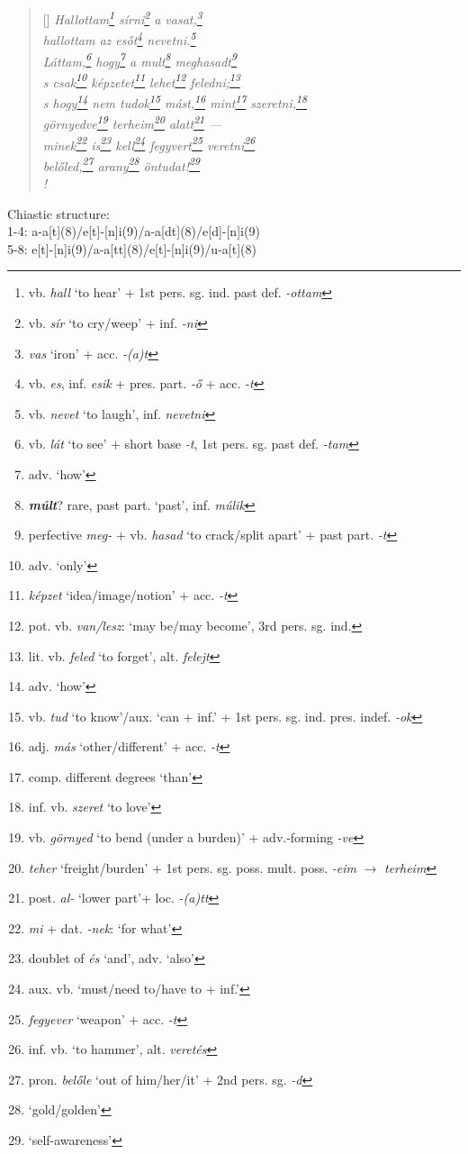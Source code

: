 \documentclass[a4paper,12pt,twoside,final]{book}
\begin{document}
\begin{verse}[\versewidth]
  \it
  Hallottam\footnote{vb. \emph{hall} `to hear' + 1st
  pers. sg. ind. past def. \emph{-ottam}} sírni\footnote{vb.
  \emph{sír} `to cry/weep' + inf. \emph{-ni}} a
  vasat,\footnote{\emph{vas} `iron' + acc. \emph{-(a)t}} \\
  hallottam az esőt\footnote{vb. \emph{es}, inf. \emph{esik} +
  pres. part. \emph{-ő} + acc. \emph{-t}} nevetni.\footnote{vb.
  \emph{nevet} `to laugh', inf. \emph{nevetni}} \\
  Láttam,\footnote{vb. \emph{lát} `to see' +
  short base \emph{-t}, 1st pers. sg. past def. \emph{-tam}}
  hogy\footnote{adv. `how'} a mult\footnote{\textbf{\emph{múlt}}?
  rare, past part. `past', inf. \emph{múlik}}
  meghasadt\footnote{perfective \emph{meg-} + vb.
  \emph{hasad} `to crack/split apart' + past
  part. \emph{-t}} \\
  s csak\footnote{adv. `only'} képzetet\footnote{\emph{képzet}
  `idea/image/notion' + acc. \emph{-t}}
  lehet\footnote{pot. vb. \emph{van/lesz}:
  `may be/may become', 3rd pers. sg. ind.}
  feledni;\footnote{lit. vb. \emph{feled} `to forget', alt. \emph{felejt}} \\
  s hogy\footnote{adv. `how'} nem tudok\footnote{vb.
  \emph{tud} `to know'/aux. `can + inf.' + 1st
  pers. sg. ind. pres. indef. \emph{-ok}}
  mást,\footnote{adj. \emph{más} `other/different' + acc. \emph{-t}}
  mint\footnote{comp. different degrees `than'}
  szeretni,\footnote{inf. vb. \emph{szeret} `to love'} \\
  görnyedve\footnote{vb. \emph{görnyed} `to bend (under a
  burden)' + adv.-forming \emph{-ve}} terheim\footnote{\emph{teher}
  `freight/burden' + 1st
  pers. sg. poss. mult. poss. \emph{-eim} $\rightarrow$ \emph{terheim}}
  alatt\footnote{post. \emph{al-} `lower part'+ loc. \emph{-(a)tt}}
  --- \\
  minek\footnote{\emph{mi} + dat. \emph{-nek}: `for what'}
  is\footnote{doublet of \emph{és} `and', adv. `also'}
  kell\footnote{aux. vb. `must/need to/have to + inf.'}
  fegyvert\footnote{\emph{fegyever} `weapon' + acc. \emph{-t}}
    veretni\footnote{inf. vb. `to hammer', alt. \emph{veretés}} \\
  belőled,\footnote{pron. \emph{belőle} `out of him/her/it' + 2nd
  pers. sg. \emph{-d}} arany\footnote{`gold/golden'}
  öntudat!\footnote{`self-awareness'} \\!
\end{verse}

\noindent Chiastic structure: \\
1-4: a-a[t](8)/e[t]-[n]i(9)/a-a[dt](8)/e[d]-[n]i(9) \\
5-8: e[t]-[n]i(9)/a-a[tt](8)/e[t]-[n]i(9)/u-a[t](8)
\end{document}
